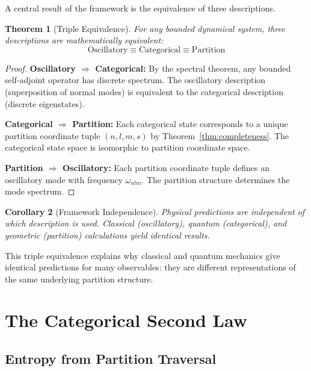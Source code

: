 \documentclass[twocolumn,10pt,a4paper]{article}
\newtheorem{theorem}{Theorem}[section]
\newtheorem{corollary}[theorem]{Corollary}
\theoremstyle{definition}
\theoremstyle{remark}
\begin{document}
A central result of the framework is the equivalence of three descriptions.

\begin{theorem}[Triple Equivalence]
\label{thm:triple}
For any bounded dynamical system, three descriptions are mathematically equivalent:
\begin{equation}
    \boxed{\text{Oscillatory} \equiv \text{Categorical} \equiv \text{Partition}}
\end{equation}
\end{theorem}

\begin{proof}
\textbf{Oscillatory $\Rightarrow$ Categorical:}
By the spectral theorem, any bounded self-adjoint operator has discrete spectrum. The oscillatory description (superposition of normal modes) is equivalent to the categorical description (discrete eigenstates).

\textbf{Categorical $\Rightarrow$ Partition:}
Each categorical state corresponds to a unique partition coordinate tuple $(n, l, m, s)$ by Theorem~\ref{thm:completeness}. The categorical state space is isomorphic to partition coordinate space.

\textbf{Partition $\Rightarrow$ Oscillatory:}
Each partition coordinate tuple defines an oscillatory mode with frequency $\omega_{nlm}$. The partition structure determines the mode spectrum.
\end{proof}

\begin{corollary}[Framework Independence]
Physical predictions are independent of which description is used. Classical (oscillatory), quantum (categorical), and geometric (partition) calculations yield identical results.
\end{corollary}

This triple equivalence explains why classical and quantum mechanics give identical predictions for many observables: they are different representations of the same underlying partition structure.

\section{The Categorical Second Law}
\label{sec:secondlaw}

\subsection{Entropy from Partition Traversal}
\end{document}
